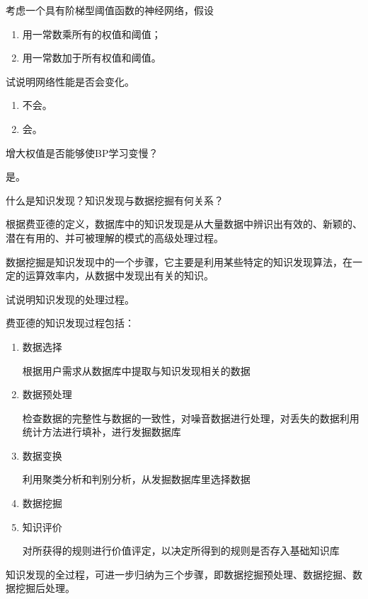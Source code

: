 \begin{question}
考虑一个具有阶梯型阈值函数的神经网络，假设
	\begin{enumerate}
		\item 用一常数乘所有的权值和阈值； 
		\item 用一常数加于所有权值和阈值。 
	\end{enumerate}
试说明网络性能是否会变化。
\end{question}
\begin{solution}
\begin{enumerate}
	\item 不会。
	\item 会。
\end{enumerate}
\end{solution}

\begin{question}
增大权值是否能够使BP学习变慢？
\end{question}
\begin{solution}
是。
\end{solution}

\begin{question}
什么是知识发现？知识发现与数据挖掘有何关系？ 
\end{question}
\begin{solution}
根据费亚德的定义，数据库中的知识发现是从大量数据中辨识出有效的、新颖的、潜在有用的、并可被理解的模式的高级处理过程。\par
数据挖掘是知识发现中的一个步骤，它主要是利用某些特定的知识发现算法，在一定的运算效率内，从数据中发现出有关的知识。
\end{solution}

\begin{question}
试说明知识发现的处理过程。
\end{question}
\begin{solution}
费亚德的知识发现过程包括：
	\begin{enumerate}
		\item 数据选择 \par
		根据用户需求从数据库中提取与知识发现相关的数据 
		\item 数据预处理 \par
		检查数据的完整性与数据的一致性，对噪音数据进行处理，对丢失的数据利用统计方法进行填补，进行发掘数据库
		\item 数据变换 \par
		利用聚类分析和判别分析，从发掘数据库里选择数据
		\item 数据挖掘 
		\item 知识评价 \par
		对所获得的规则进行价值评定，以决定所得到的规则是否存入基础知识库 
	\end{enumerate}\par
	知识发现的全过程，可进一步归纳为三个步骤，即数据挖掘预处理、数据挖掘、数据挖掘后处理。 
\end{solution}

